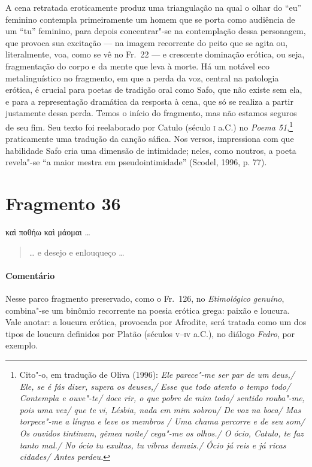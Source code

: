 {{A cena retratada eroticamente produz uma triangulação na qual o olhar do “eu”
feminino contempla primeiramente um homem que se porta como audiência de um
“tu” feminino, para depois concentrar"-se na contemplação dessa
personagem, que provoca sua excitação --- na imagem recorrente do peito que se agita ou,
literalmente, voa, como se vê no Fr.~22 --- e crescente dominação erótica, ou
seja, fragmentação do corpo e da mente que leva à morte. Há um notável eco
metalinguístico no fragmento, em que a perda da voz, central na patologia
erótica, é crucial para poetas de tradição oral como Safo, que não existe sem
ela, e para a representação dramática da resposta à cena, que só se realiza a
partir justamente dessa perda. Temos o início do fragmento, mas não estamos
seguros de seu fim. Seu texto foi reelaborado por Catulo (século \textsc{i}
a.C.) no \textit{Poema 51},\footnote{ Cito"-o, em tradução de Oliva (1996):
\textit{Ele parece"-me ser par de um deus,/ Ele, se é fás dizer, supera os
deuses,/ Esse que todo atento o tempo todo/ Contempla e ouve"-te/ doce rir, o
que pobre de mim todo/ sentido rouba"-me, pois uma vez/ que te vi, Lésbia,
nada em mim sobrou/ De voz na boca/ Mas torpece"-me a língua e leve os membros
/ Uma chama percorre e de seu som/ Os ouvidos tintinam, gêmea noite/ cega"-me
os olhos./ O ócio, Catulo, te faz tanto mal./ No ócio tu exultas, tu vibras
demais./ Ócio já reis e já ricas cidades/ Antes perdeu.}} praticamente uma
tradução da canção sáfica.
Nos versos, impressiona com que habilidade Safo cria uma dimensão de intimidade; neles, como noutros, a poeta revela"-se “a maior mestra em pseudointimidade” (Scodel, 1996, p. 77).}



\pagebreak
\section{Fragmento 36}

\begin{gkverse}
καὶ ποθήω καὶ μάομαι \ldots{}
\end{gkverse}

\begin{verse}
\ldots{} e desejo e enlouqueço \ldots{}
\end{verse}

{\paragraph{Comentário} Nesse parco fragmento preservado, como o Fr.~126, no \textit{Etimológico genuíno}, combina"-se um binômio recorrente na poesia erótica grega:
paixão e loucura. Vale anotar: a loucura erótica, provocada por Afrodite, será
tratada como um dos tipos de loucura definidos por Platão (séculos \textsc{v}--\textsc{iv} a.C.),
no diálogo \textit{Fedro}, por exemplo.}


}
